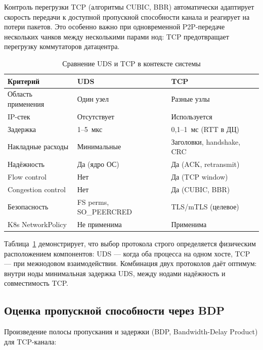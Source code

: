 Контроль перегрузки TCP (алгоритмы CUBIC, BBR) автоматически адаптирует скорость передачи к доступной пропускной способности канала и реагирует на потери пакетов. Это особенно важно при одновременной P2P-передаче нескольких чанков между несколькими парами нод: TCP предотвращает перегрузку коммутаторов датацентра.

\begin{table}[htbp]
\centering
\caption{Сравнение UDS и TCP в контексте системы}
\label{tab:uds_tcp}
\begin{tabularx}{\textwidth}{p{52mm}Xp{52mm}}
\toprule
\textbf{Критерий} & \textbf{UDS} & \textbf{TCP} \\
\midrule
Область применения     & Один узел                & Разные узлы \\
IP-стек                & Отсутствует              & Используется \\
Задержка               & 1--5~мкс                 & 0,1--1~мс (RTT в ДЦ) \\
Накладные расходы      & Минимальные              & Заголовки, handshake, CRC \\
Надёжность             & Да (ядро ОС)             & Да (ACK, retransmit) \\
Flow control           & Нет                      & Да (TCP window) \\
Congestion control     & Нет                      & Да (CUBIC, BBR) \\
Безопасность           & FS perms, SO\_PEERCRED   & TLS/mTLS (целевое) \\
K8s NetworkPolicy      & Не применима             & Применима \\
\bottomrule
\end{tabularx}
\end{table}

Таблица~\ref{tab:uds_tcp} демонстрирует, что выбор протокола строго определяется физическим расположением компонентов: UDS --- когда оба процесса на одном хосте, TCP --- при межнодовом взаимодействии. Комбинация двух протоколов даёт оптимум: внутри ноды минимальная задержка UDS, между нодами надёжность и совместимость TCP.

\subsection*{Оценка пропускной способности через BDP}

Произведение полосы пропускания и задержки (BDP, Bandwidth-Delay Product) для TCP-канала:

